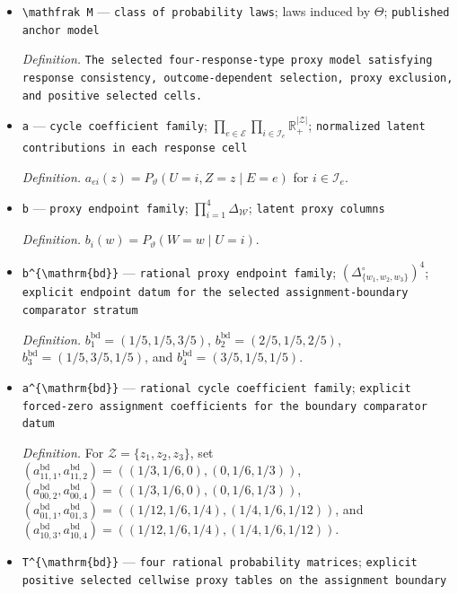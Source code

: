 \documentclass{article}
\begin{document}
\begin{itemize}
  \item \texttt{\textbackslash{}\allowbreak{}mathfrak M} --- \texttt{class of probability laws}; laws induced by \(\Theta\); \texttt{published anchor model}
  \par\smallskip\noindent\emph{Definition.} \texttt{The selected four-\allowbreak{}response-\allowbreak{}type proxy model satisfying response consistency,\allowbreak{} outcome-\allowbreak{}dependent selection,\allowbreak{} proxy exclusion,\allowbreak{} and positive selected cells.}
  \item \texttt{a} --- \texttt{cycle coefficient family}; \(\prod_{e\in\mathcal E}\prod_{i\in\mathcal I_e}\mathbb R_{+}^{|\mathcal Z|}\); \texttt{normalized latent contributions in each response cell}
  \par\smallskip\noindent\emph{Definition.} \(a_{ei}(z)=P_{\vartheta}(U=i,Z=z\mid E=e)\) for \(i\in\mathcal I_e\).
  \item \texttt{b} --- \texttt{proxy endpoint family}; \(\prod_{i=1}^4\Delta_{\mathcal W}\); \texttt{latent proxy columns}
  \par\smallskip\noindent\emph{Definition.} \(b_i(w)=P_{\vartheta}(W=w\mid U=i)\).
  \item \texttt{b\textasciicircum{}\{\textbackslash{}\allowbreak{}mathrm\{bd\}\allowbreak{}\}\allowbreak{}} --- \texttt{rational proxy endpoint family}; \((\Delta_{\{w_1,w_2,w_3\}}^{\circ})^4\); \texttt{explicit endpoint datum for the selected assignment-\allowbreak{}boundary comparator stratum}
  \par\smallskip\noindent\emph{Definition.} \(b^{\mathrm{bd}}_1=(1/5,1/5,3/5)\), \(b^{\mathrm{bd}}_2=(2/5,1/5,2/5)\), \(b^{\mathrm{bd}}_3=(1/5,3/5,1/5)\), and \(b^{\mathrm{bd}}_4=(3/5,1/5,1/5)\).
  \item \texttt{a\textasciicircum{}\{\textbackslash{}\allowbreak{}mathrm\{bd\}\allowbreak{}\}\allowbreak{}} --- \texttt{rational cycle coefficient family}; \texttt{explicit forced-\allowbreak{}zero assignment coefficients for the boundary comparator datum}
  \par\smallskip\noindent\emph{Definition.} For \(\mathcal Z=\{z_1,z_2,z_3\}\), set \((a^{\mathrm{bd}}_{11,1},a^{\mathrm{bd}}_{11,2})=((1/3,1/6,0),(0,1/6,1/3))\), \((a^{\mathrm{bd}}_{00,2},a^{\mathrm{bd}}_{00,4})=((1/3,1/6,0),(0,1/6,1/3))\), \((a^{\mathrm{bd}}_{01,1},a^{\mathrm{bd}}_{01,3})=((1/12,1/6,1/4),(1/4,1/6,1/12))\), and \((a^{\mathrm{bd}}_{10,3},a^{\mathrm{bd}}_{10,4})=((1/12,1/6,1/4),(1/4,1/6,1/12))\).
  \item \texttt{T\textasciicircum{}\{\textbackslash{}\allowbreak{}mathrm\{bd\}\allowbreak{}\}\allowbreak{}} --- \texttt{four rational probability matrices}; \texttt{explicit positive selected cellwise proxy tables on the assignment boundary}

\end{itemize}
\end{document}
